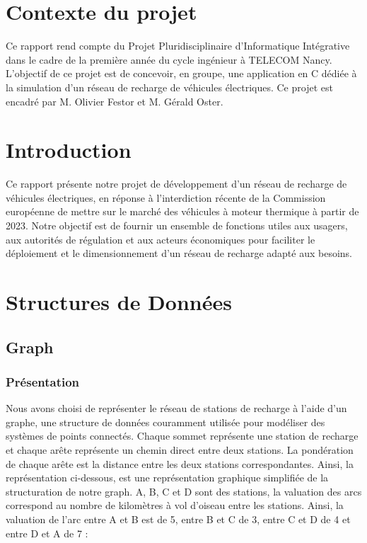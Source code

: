 \documentclass[french,a4paper]{article}
\begin{document}
\section{Contexte du projet}
Ce rapport rend compte du Projet Pluridisciplinaire d’Informatique Intégrative dans le cadre de la première année du cycle ingénieur à TELECOM Nancy.
L’objectif de ce projet est de concevoir, en groupe,  une application en C dédiée à la simulation d’un réseau de recharge de véhicules électriques. Ce projet est encadré par M. Olivier Festor et M. Gérald Oster.
\section{Introduction}
Ce rapport présente notre projet de développement d'un réseau de recharge de véhicules électriques, en réponse à l'interdiction récente de la Commission européenne de mettre sur le marché des véhicules à moteur thermique à partir de 2023. Notre objectif est de fournir un ensemble de fonctions utiles aux usagers, aux autorités de régulation et aux acteurs économiques pour faciliter le déploiement et le dimensionnement d'un réseau de recharge adapté aux besoins.
\section{Structures de Données}
\subsection{Graph}
\subsubsection{Présentation}
Nous avons choisi de représenter le réseau de stations de recharge à l'aide d'un graphe, une structure de données couramment utilisée pour modéliser des systèmes de points connectés. Chaque sommet représente une station de recharge et chaque arête représente un chemin direct entre deux stations. La pondération de chaque arête est la distance entre les deux stations correspondantes.
Ainsi, la représentation ci-dessous, est une représentation graphique simplifiée de la structuration de notre graph. A, B, C et D sont des stations, la valuation des arcs correspond au nombre de kilomètres à vol d'oiseau entre les stations. Ainsi, la valuation de l'arc entre A et B est de 5, entre B et C de 3, entre C et D de 4 et entre D et A de 7 :
\end{document}
